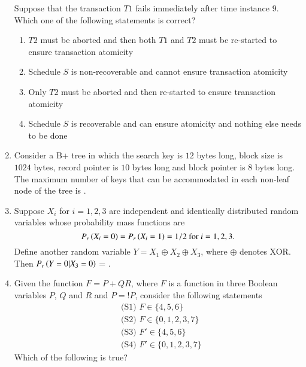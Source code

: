 \documentclass[journal,12pt,onecolumn]{IEEEtran}
\theoremstyle{remark}
\begin{document}
\begin{enumerate}
		Suppose that the transaction $T1$ fails immediately after time instance $9$. Which one of the following statements is correct?
		
		\hfill{}
		
		\begin{enumerate}
			\item $T2$ must be aborted and then both $T1$ and $T2$ must be re-started to ensure transaction atomicity
			\item Schedule $S$ is non-recoverable and cannot ensure transaction atomicity
			\item Only $T2$ must be aborted and then re-started to ensure transaction atomicity
			\item Schedule $S$ is recoverable and can ensure atomicity and nothing else needs to be done
		\end{enumerate}
		
		\item Consider a B+ tree in which the search key is $12$ bytes long, block size is $1024$ bytes, record pointer is $10$ bytes long and block pointer is $8$ bytes long. The maximum number of keys that can be accommodated in each non-leaf node of the tree is \underline{\hspace{2cm}}.
		
		\hfill{}
		
		\item Suppose $X_i$ for $i=1,2,3$ are independent and identically distributed random variables whose probability mass functions are
		$$P_r\left(X_i = 0\right) = P_r\left(X_i = 1\right) = 1/2 \text{ for } i = 1,2,3.$$
		Define another random variable $Y = X_1 \oplus X_2 \oplus X_3$, where $\oplus$ denotes XOR. Then $P_r\left(Y = 0 | X_3 = 0\right)$ = \underline{\hspace{2cm}}.
		
		\hfill{}
		
		\item Given the function $F = P + QR$, where $F$ is a function in three Boolean variables $P$, $Q$ and $R$ and $P = !P$, consider the following statements
		\begin{align*}
			&\text{(S1) } F \in \{4,5,6\}\\
			&\text{(S2) } F \in \{0,1,2,3,7\}\\
			&\text{(S3) } F' \in \{4,5,6\}\\
			&\text{(S4) } F' \in \{0,1,2,3,7\}
		\end{align*}
		Which of the following is true?
		

\end{enumerate}
\end{document}
